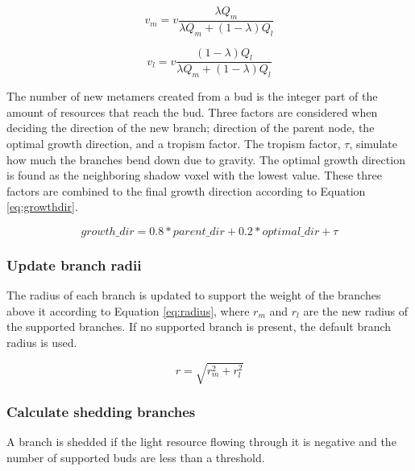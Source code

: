 \documentclass{article}
\begin{document}
	  			\begin{equation}
	  				\label{eq:vm}
	  				v_m = v\frac{\lambda Q_m}{\lambda Q_m + (1 - \lambda)Q_l}
	  			\end{equation}
	  			
	  			\begin{equation}
	  				\label{eq:vl}
	  				v_l = v\frac{(1 - \lambda) Q_l}{\lambda Q_m + (1 - \lambda)Q_l}
	  			\end{equation}
	  			
	  			The number of new metamers created from a bud is the integer part of the amount of resources that reach the bud. Three factors are considered when deciding the direction of the new branch; direction of the parent node, the optimal growth direction, and a tropism factor. The tropism factor, $\tau$, simulate how much the branches bend down due to gravity. The optimal growth direction  is found as the neighboring shadow voxel with the lowest value. These three factors are combined to the final growth direction according to Equation \ref{eq:growthdir}. \citep{palubicki2009self}
	  			
	  			\begin{equation}
	  				\label{eq:growthdir}
	  				growth\_dir = 0.8 * parent\_dir + 0.2 * optimal\_dir + \tau
	  			\end{equation}
	  			
	  		\subsubsection*{Update branch radii}
	  			
	  			The radius of each branch is updated to support the weight of the branches above it according to Equation \ref{eq:radius}, where $r_m$ and $r_l$ are the new radius of the supported branches. If no supported branch is present, the default branch radius is used. \citep{mvech1996visual}
	  			
	  			\begin{equation}
	  				\label{eq:radius}
	  				r = \sqrt{r_m^2 + r_l^2}
	  			\end{equation}
	  			
	  		\subsubsection*{Calculate shedding branches}
	  			
	  			A branch is shedded if the light resource flowing through it is negative and the number of supported buds are less than a threshold.
	  			\citep{mvech1996visual}
	  		
\end{document}
